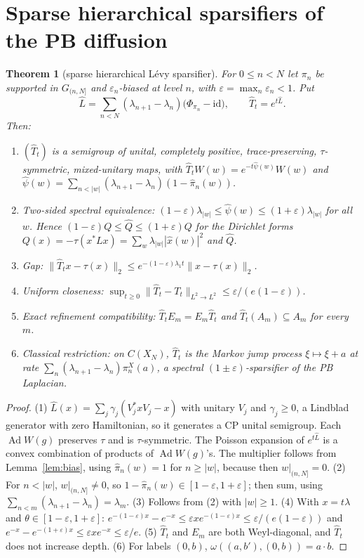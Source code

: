 \documentclass[11pt]{article}
\newtheorem{theorem}{Theorem}[section]
\theoremstyle{definition}
\theoremstyle{remark}
\newcommand{\Ad}{\operatorname{Ad}}
\newcommand{\id}{\mathrm{id}}
\newcommand{\dep}[1]{|#1|}
\begin{document}
\section{Sparse hierarchical sparsifiers of the PB diffusion}\label{sec:sparse}

\begin{theorem}[sparse hierarchical L\'evy sparsifier]\label{thm:sparse}
For $0\le n<N$ let $\pi_n$ be supported in $G_{(n,N]}$ and $\varepsilon_n$-biased at level $n$, with $\varepsilon=\max_n\varepsilon_n<1$. Put
\[\hat L=\sum_{n<N}(\lambda_{n+1}-\lambda_n)\big(\Phi_{\pi_n}-\id\big),\qquad \hat T_t=e^{t\hat L}.\]
Then:
\begin{enumerate}
\item $(\hat T_t)$ is a semigroup of unital, completely positive, trace-preserving, $\tau$-symmetric, mixed-unitary maps, with $\hat T_tW(w)=e^{-t\hat\psi(w)}W(w)$ and $\hat\psi(w)=\sum_{n<\dep w}(\lambda_{n+1}-\lambda_n)(1-\hat\pi_n(w))$.
\item \emph{Two-sided spectral equivalence:} $(1-\varepsilon)\lambda_{\dep w}\le\hat\psi(w)\le(1+\varepsilon)\lambda_{\dep w}$ for all $w$. Hence $(1-\varepsilon)Q\le\hat Q\le(1+\varepsilon)Q$ for the Dirichlet forms $Q(x)=-\tau(x^*Lx)=\sum_w\lambda_{\dep w}|\hat x(w)|^2$ and $\hat Q$.
\item \emph{Gap:} $\|\hat T_tx-\tau(x)\|_2\le e^{-(1-\varepsilon)\lambda_1t}\|x-\tau(x)\|_2$.
\item \emph{Uniform closeness:} $\sup_{t\ge0}\|\hat T_t-T_t\|_{L^2\to L^2}\le\varepsilon/(e(1-\varepsilon))$.
\item \emph{Exact refinement compatibility:} $\hat T_tE_m=E_m\hat T_t$ and $\hat T_t(A_m)\subseteq A_m$ for every $m$.
\item \emph{Classical restriction:} on $C(X_N)$, $\hat T_t$ is the Markov jump process $\xi\mapsto\xi+a$ at rate $\sum_n(\lambda_{n+1}-\lambda_n)\pi_n^X(a)$, a spectral $(1\pm\varepsilon)$-sparsifier of the PB Laplacian.
\end{enumerate}
\end{theorem}

\begin{proof}
(1) $\hat L(x)=\sum_j\gamma_j(V_j^*xV_j-x)$ with unitary $V_j$ and $\gamma_j\ge0$, a Lindblad generator with zero Hamiltonian, so it generates a CP unital semigroup. Each $\Ad W(g)$ preserves $\tau$ and is $\tau$-symmetric. The Poisson expansion of $e^{t\hat L}$ is a convex combination of products of $\Ad W(g)$'s. The multiplier follows from Lemma~\ref{lem:bias}, using $\hat\pi_n(w)=1$ for $n\ge\dep w$, because then $w|_{(n,N]}=0$.
(2) For $n<\dep w$, $w|_{(n,N]}\ne0$, so $1-\hat\pi_n(w)\in[1-\varepsilon,1+\varepsilon]$; then sum, using $\sum_{n<m}(\lambda_{n+1}-\lambda_n)=\lambda_m$.
(3) Follows from (2) with $\dep w\ge1$.
(4) With $x=t\lambda$ and $\theta\in[1-\varepsilon,1+\varepsilon]$: $e^{-(1-\varepsilon)x}-e^{-x}\le\varepsilon xe^{-(1-\varepsilon)x}\le\varepsilon/(e(1-\varepsilon))$ and $e^{-x}-e^{-(1+\varepsilon)x}\le\varepsilon xe^{-x}\le\varepsilon/e$.
(5) $\hat T_t$ and $E_m$ are both Weyl-diagonal, and $\hat T_t$ does not increase depth.
(6) For labels $(0,b)$, $\omega((a,b'),(0,b))=a\cdot b$.
\end{proof}
\end{document}
